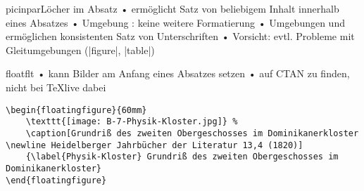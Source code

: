 

\begin{frame}[fragile]{picinpar}{Löcher im Absatz}
•  ermöglicht Satz von beliebigem Inhalt innerhalb eines Absatzes
• Umgebung : keine weitere Formatierung
• Umgebungen  und  ermöglichen konsistenten Satz von Unterschriften
• \alert{Vorsicht: } evtl. Probleme mit Gleitumgebungen (|figure|, |table|)
\•
\end{frame}

\begin{frame}[fragile]{floatflt}
•  kann Bilder am Anfang eines Absatzes setzen
• auf CTAN zu finden, nicht bei \TeX live dabei
\•
\begin{lstlisting}
\begin{floatingfigure}{60mm}
    \texttt{[image: B-7-Physik-Kloster.jpg]} %
    \caption[Grundriß des zweiten Obergeschosses im Dominikanerkloster \newline Heidelberger Jahrbücher der Literatur 13,4 (1820)]
    {\label{Physik-Kloster} Grundriß des zweiten Obergeschosses im Dominikanerkloster}
\end{floatingfigure}
\end{lstlisting}
\end{frame}


